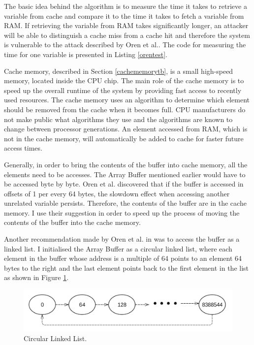 \documentclass[10pt,a4paper,twoside]{book}
\begin{document}
The basic idea behind the algorithm is to measure the time it takes to retrieve a variable from cache and compare it to the time it takes to fetch a variable from RAM. If retrieving the variable from RAM takes significantly longer, an attacker will be able to distinguish a cache miss from a cache hit and therefore the system is vulnerable to the attack described by Oren et al.\cite{oren2015spy}. The code for measuring the time for one variable is presented in Listing \ref{orentest}.

Cache memory, described in Section \ref{cachememorytb}, is a small high-speed memory, located inside the CPU chip. The main role of the cache memory is to speed up the overall runtime of the system by providing fast access to recently used resources. The cache memory uses an algorithm to determine which element should be removed from the cache when it becomes full. CPU manufacturers do not make public what algorithms they use and the algorithms are known to change between processor generations. An element accessed from RAM, which is not in the cache memory, will automatically be added to cache for faster future access times. 

Generally, in order to bring the contents of the buffer into cache memory, all the elements need to be accesses. The Array Buffer mentioned earlier would have to be accessed byte by byte. Oren et al. \cite{oren2015spy} discovered that if the buffer is accessed in offsets of 1 per every 64 bytes, the slowdown effect when accessing another unrelated variable persists. Therefore, the contents of the buffer are in the cache memory. I use their suggestion in order to speed up the process of moving the contents of the buffer into the cache memory.

Another recommendation made by Oren et al. in \cite{oren2015spy} was to access the buffer as a linked list. I initialised the Array Buffer as a circular linked list, where each element in the buffer whose address is a multiple of 64 points to an element 64 bytes to the right and the last element points back to the first element in the list as shown in Figure \ref{circularlinkedlist}.

\begin{figure}[h]
\centering
\includegraphics[width=\textwidth]{figures/circularlinkedlist.png}
\caption{Circular Linked List.}
\label{circularlinkedlist}
\end{figure}
\end{document}

